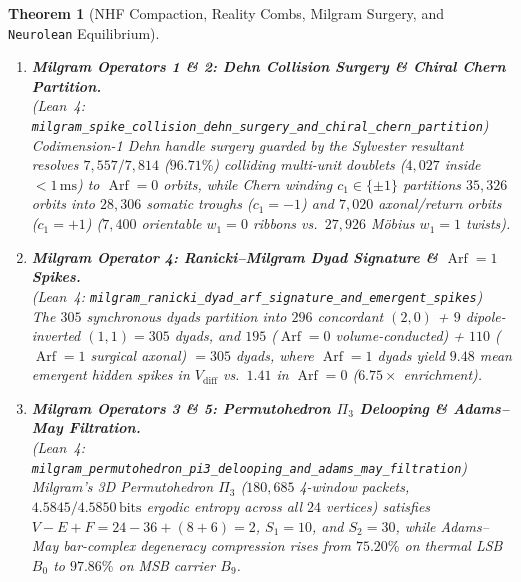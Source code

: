 \documentclass[11pt,letterpaper]{article}
\newcommand{\lean}[1]{\nolinkurl{#1}}
\newtheorem{theorem}{Theorem}[section]
\theoremstyle{definition}
\begin{document}
\begin{theorem}[NHF Compaction, Reality Combs, Milgram Surgery, and \texttt{Neurolean} Equilibrium]
\begin{enumerate}
  (\emph{Lean~4:} \lean{reality_comb_koopman_jet_and_bargmann_entropy_dominance})\\
  Lifting raw voltage $V$ ($R^2 = 0.2786$) to the 5D nonlinear Koopman jet $(V, \dot{V}, \ddot{V}, V^2-\langle V^2\rangle, V\dot{V})$ boosts active spike-orbit reconstruction to $R^2 = 0.5370$ ($1.961\times$ mean gain), while the 16-mode Holomorphic Bargmann--Segal transform $z = (q + ip)/\sqrt{2}$ reduces localization entropy from $6.0311\,\text{bits}$ (STFT) to $2.7416\,\text{bits}$ ($< 1/2$).
  \item \textbf{Milgram Operators 1 \& 2: Dehn Collision Surgery \& Chiral Chern Partition.}\\
  (\emph{Lean~4:} \lean{milgram_spike_collision_dehn_surgery_and_chiral_chern_partition})\\
  Codimension-1 Dehn handle surgery guarded by the Sylvester resultant resolves $7{,}557 / 7{,}814$ ($96.71\%$) colliding multi-unit doublets ($4{,}027$ inside $< 1\,\text{ms}$) to $\operatorname{Arf}=0$ orbits, while Chern winding $c_1 \in \{\pm 1\}$ partitions $35{,}326$ orbits into $28{,}306$ somatic troughs ($c_1 = -1$) and $7{,}020$ axonal/return orbits ($c_1 = +1$) ($7{,}400$ orientable $w_1 = 0$ ribbons vs.\ $27{,}926$ M\"{o}bius $w_1 = 1$ twists).
  \item \textbf{Milgram Operator 4: Ranicki--Milgram Dyad Signature \& $\operatorname{Arf}=1$ Spikes.}\\
  (\emph{Lean~4:} \lean{milgram_ranicki_dyad_arf_signature_and_emergent_spikes})\\
  The $305$ synchronous dyads partition into $296$ concordant $(2,0)$ + $9$ dipole-inverted $(1,1) = 305$ dyads, and $195$ ($\operatorname{Arf}=0$ volume-conducted) + $110$ ($\operatorname{Arf}=1$ surgical axonal) $= 305$ dyads, where $\operatorname{Arf}=1$ dyads yield $9.48$ mean emergent hidden spikes in $V_{\mathrm{diff}}$ vs.\ $1.41$ in $\operatorname{Arf}=0$ ($6.75\times$ enrichment).
  \item \textbf{Milgram Operators 3 \& 5: Permutohedron $\Pi_3$ Delooping \& Adams--May Filtration.}\\
  (\emph{Lean~4:} \lean{milgram_permutohedron_pi3_delooping_and_adams_may_filtration})\\
  Milgram's 3D Permutohedron $\Pi_3$ ($180{,}685$ 4-window packets, $4.5845 / 4.5850\,\text{bits}$ ergodic entropy across all $24$ vertices) satisfies $V - E + F = 24 - 36 + (8 + 6) = 2$, $S_1 = 10$, and $S_2 = 30$, while Adams--May bar-complex degeneracy compression rises from $75.20\%$ on thermal LSB $B_0$ to $97.86\%$ on MSB carrier $B_9$.

\end{enumerate}
\end{theorem}
\end{document}
